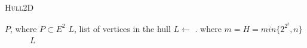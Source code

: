 \documentclass[12pt]{article}
\begin{document}
\begin{algorithm}\caption{\textsc{Hull2D}}\label{alg:hull2d}
\begin{algorithmic}[2]
 $P$, where $P \subset E^2$
 $L$, list of vertices in the hull
\State $L \gets$ . where $m=H=min\{2^{2^t}, n \}$
\\
~~~~~~\Return $L$
\EndIf
\EndFor
\end{algorithmic}
\end{algorithm}
\end{document}
